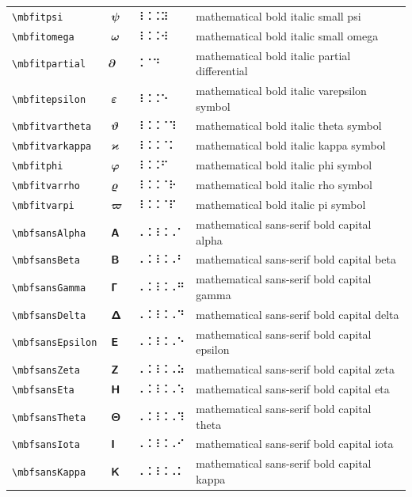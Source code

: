 \documentclass[oneside]{article}
\begin{document}
\begin{longtable}{llll}
\verb|\mbfitpsi| & $\mbfitpsi$ &  ⠸⠨⠨⠽  & {mathematical bold italic small psi} \\[2ex]
\verb|\mbfitomega| & $\mbfitomega$ &  ⠸⠨⠨⠺  & {mathematical bold italic small omega} \\[2ex]
\verb|\mbfitpartial| & $\mbfitpartial$ &  ⠨⠈⠙  & {mathematical bold italic partial differential} \\[2ex]
\verb|\mbfitepsilon| & $\mbfitepsilon$ &  ⠸⠨⠨⠑  & {mathematical bold italic varepsilon symbol} \\[2ex]
\verb|\mbfitvartheta| & $\mbfitvartheta$ &  ⠸⠨⠨⠈⠹  & {mathematical bold italic theta symbol} \\[2ex]
\verb|\mbfitvarkappa| & $\mbfitvarkappa$ &  ⠸⠨⠨⠈⠅  & {mathematical bold italic kappa symbol} \\[2ex]
\verb|\mbfitphi| & $\mbfitphi$ &  ⠸⠨⠨⠋  & {mathematical bold italic phi symbol} \\[2ex]
\verb|\mbfitvarrho| & $\mbfitvarrho$ &  ⠸⠨⠨⠈⠗  & {mathematical bold italic rho symbol} \\[2ex]
\verb|\mbfitvarpi| & $\mbfitvarpi$ &  ⠸⠨⠨⠈⠏  & {mathematical bold italic pi symbol} \\[2ex]
\verb|\mbfsansAlpha| & $\mbfsansAlpha$ &  ⠠⠨⠸⠨⠠⠁  & {mathematical sans-serif bold capital alpha} \\[2ex]
\verb|\mbfsansBeta| & $\mbfsansBeta$ &  ⠠⠨⠸⠨⠠⠃  & {mathematical sans-serif bold capital beta} \\[2ex]
\verb|\mbfsansGamma| & $\mbfsansGamma$ &  ⠠⠨⠸⠨⠠⠛  & {mathematical sans-serif bold capital gamma} \\[2ex]
\verb|\mbfsansDelta| & $\mbfsansDelta$ &  ⠠⠨⠸⠨⠠⠙  & {mathematical sans-serif bold capital delta} \\[2ex]
\verb|\mbfsansEpsilon| & $\mbfsansEpsilon$ &  ⠠⠨⠸⠨⠠⠑  & {mathematical sans-serif bold capital epsilon} \\[2ex]
\verb|\mbfsansZeta| & $\mbfsansZeta$ &  ⠠⠨⠸⠨⠠⠵  & {mathematical sans-serif bold capital zeta} \\[2ex]
\verb|\mbfsansEta| & $\mbfsansEta$ &  ⠠⠨⠸⠨⠠⠱  & {mathematical sans-serif bold capital eta} \\[2ex]
\verb|\mbfsansTheta| & $\mbfsansTheta$ &  ⠠⠨⠸⠨⠠⠹  & {mathematical sans-serif bold capital theta} \\[2ex]
\verb|\mbfsansIota| & $\mbfsansIota$ &  ⠠⠨⠸⠨⠠⠊  & {mathematical sans-serif bold capital iota} \\[2ex]
\verb|\mbfsansKappa| & $\mbfsansKappa$ &  ⠠⠨⠸⠨⠠⠅  & {mathematical sans-serif bold capital kappa} \\[2ex]

\end{longtable}
\end{document}
